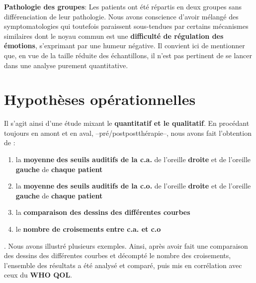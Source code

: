 \textbf{ Pathologie des groupes}: Les patients ont été répartis en deux groupes sans différenciation de
 leur pathologie. Nous avons conscience d'avoir mélangé des symptomatologies qui
 toutefois paraissent
 sous-tendues par
                                               certains mécanismes
                                               similaires dont le
                                               noyau commun est une
                                              \textbf{difficulté de
                                               régulation des
                                               émotions},
                                               s'exprimant par une
                                               humeur négative.
                                               Il convient ici de mentionner que, en vue de la taille réduite des échantillons, il n'est pas
pertinent de se lancer dans une analyse purement
quantitative.

\section{Hypothèses opérationnelles}

Il s'agit ainsi d'une étude mixant le \textbf{quantitatif  et le
  qualitatif}.
En procédant toujours en amont et en aval, --pré/postpostthérapie--, nous
avons fait l'obtention de :
\begin{enumerate}

  \item la \textbf{moyenne} \textbf{des seuils
  auditifs de la c.a.} de l'oreille \textbf{droite} et de
  l'oreille \textbf{gauche} de \textbf{chaque patient}
  \item la \textbf{moyenne} \textbf{des seuils
  auditifs de la c.o.} de l'oreille \textbf{droite} et de
  l'oreille \textbf{gauche} de \textbf{chaque patient}
\item la \textbf{comparaison des dessins des différentes courbes}
\item le \textbf{nombre de croisements entre c.a. et c.o}
\end{enumerate}.
Nous avons illustré
plusieurs exemples.
Ainsi, après avoir
fait une comparaison des dessins des différentes courbes et
décompté le nombre des croisements, l'ensemble des résultats a été analysé et comparé, puis mis en corrélation avec ceux du\textbf{
  WHO QOL}.

